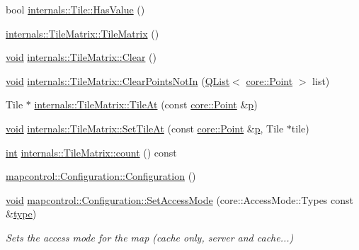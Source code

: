 \begin{DoxyCompactItemize}
\item 
bool \hyperlink{group___o_p_map_widget_ga1224388bdb3b16ffe20514aa23ef0687}{internals\-::\-Tile\-::\-Has\-Value} ()
\item 
\hyperlink{group___o_p_map_widget_ga3d1378e5fe1bbfe4113a4ce68aea7859}{internals\-::\-Tile\-Matrix\-::\-Tile\-Matrix} ()
\item 
\hyperlink{group___u_a_v_objects_plugin_ga444cf2ff3f0ecbe028adce838d373f5c}{void} \hyperlink{group___o_p_map_widget_ga77cb176c33480b11c18a63824649e839}{internals\-::\-Tile\-Matrix\-::\-Clear} ()
\item 
\hyperlink{group___u_a_v_objects_plugin_ga444cf2ff3f0ecbe028adce838d373f5c}{void} \hyperlink{group___o_p_map_widget_ga6317ab91209c66759964ba340bd3b980}{internals\-::\-Tile\-Matrix\-::\-Clear\-Points\-Not\-In} (\hyperlink{class_q_list}{Q\-List}$<$ \hyperlink{structcore_1_1_point}{core\-::\-Point} $>$ list)
\item 
Tile $\ast$ \hyperlink{group___o_p_map_widget_gacf6a186610bc126a6fdd89149f0452e6}{internals\-::\-Tile\-Matrix\-::\-Tile\-At} (const \hyperlink{structcore_1_1_point}{core\-::\-Point} \&\hyperlink{glext_8h_aa5367c14d90f462230c2611b81b41d23}{p})
\item 
\hyperlink{group___u_a_v_objects_plugin_ga444cf2ff3f0ecbe028adce838d373f5c}{void} \hyperlink{group___o_p_map_widget_gad2d5e21b31c1b3a0420990925a7e6cdc}{internals\-::\-Tile\-Matrix\-::\-Set\-Tile\-At} (const \hyperlink{structcore_1_1_point}{core\-::\-Point} \&\hyperlink{glext_8h_aa5367c14d90f462230c2611b81b41d23}{p}, Tile $\ast$tile)
\item 
\hyperlink{ioapi_8h_a787fa3cf048117ba7123753c1e74fcd6}{int} \hyperlink{group___o_p_map_widget_gad7ee58d6ccda306fff324d62676aab7a}{internals\-::\-Tile\-Matrix\-::count} () const 
\item 
\hyperlink{group___o_p_map_widget_ga0963ae98b690172299a36a61ee003c21}{mapcontrol\-::\-Configuration\-::\-Configuration} ()
\item 
\hyperlink{group___u_a_v_objects_plugin_ga444cf2ff3f0ecbe028adce838d373f5c}{void} \hyperlink{group___o_p_map_widget_ga41001a3e8948832246f19baf28c45e68}{mapcontrol\-::\-Configuration\-::\-Set\-Access\-Mode} (core\-::\-Access\-Mode\-::\-Types const \&\hyperlink{glext_8h_a7d05960f4f1c1b11f3177dc963a45d86}{type})
\begin{DoxyCompactList}\small\item\em Sets the access mode for the map (cache only, server and cache...) \end{DoxyCompactList}\item 

\end{DoxyCompactItemize}
